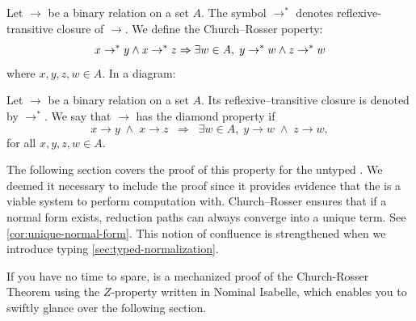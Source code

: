 \begin{definition}  
Let $\to$ be a binary relation on a set $A$. The symbol $\to^{*}$ denotes reflexive-transitive closure of $\to$. We define the Church--Rosser poperty:
\[
    x \to^{*} y \wedge x \to^{*} z \Rightarrow \exists w \in A,\; y \to^{*} w \wedge z \to^{*} w \\
\]
where $x, y, z, w \in A$. In a diagram:
  \begin{center}
  \end{center}
\end{definition}

\begin{definition}Let $\to$ be a binary relation on a set $A$. Its reflexive--transitive closure is denoted by $\to^*$. 
We say that $\to$ has the diamond property if
\[
    x \to y \;\wedge\; x \to z \;\;\Rightarrow\;\; \exists w \in A,\; y \to w \;\wedge\; z \to w,
\]
for all $x, y, z, w \in A$.
\end{definition}


The following section covers the proof of this property for the untyped \lcalc. We deemed it necessary to include the proof since it provides evidence that the \lcalc is a viable system to perform computation with. Church--Rosser ensures that if a normal form exists, reduction paths can always converge into a unique term. See \ref{cor:unique-normal-form}. This notion of confluence is strengthened when we introduce typing \ref{sec:typed-normalization}.
\begin{remark} If you have no time to spare, \cite{nagele2016mechanized} is a mechanized proof of the Church-Rosser Theorem using the $Z$-property written in Nominal Isabelle, which enables you to swiftly glance over the following section.
\end{remark}

